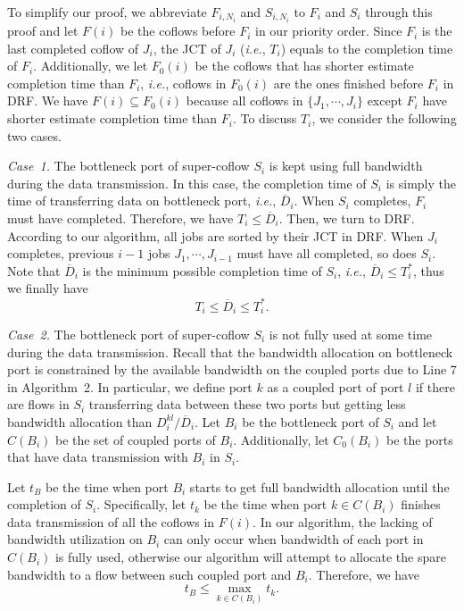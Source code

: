\documentclass[10pt, conference, letterpaper]{IEEEtran}
\begin{document}
\begin{IEEEproof}
To simplify our proof, we abbreviate $F_{i,N_i}$ and $S_{i,N_i}$ to $F_i$ and $S_i$ through this proof and let $F(i)$ be the coflows before $F_i$ in our priority order. Since $F_i$ is the last completed coflow of $J_i$, the JCT of $J_i$ (\emph{i.e.}, $T_i$) equals to the completion time of $F_i$. Additionally, we let $F_0(i)$ be the coflows that has shorter estimate completion time than $F_i$, \emph{i.e.}, coflows in $F_0(i)$ are the ones finished before $F_i$ in DRF. We have $F(i) \subseteq F_0(i)$ because all coflows in $\{J_1,\cdots,J_i\}$ except $F_i$ have shorter estimate completion time than $F_i$. To discuss $T_i$, we consider the following two cases.

\emph{Case~1.} The bottleneck port of super-coflow $S_i$ is kept using full bandwidth during the data transmission. In this case, the completion time of $S_i$ is simply the time of transferring data on bottleneck port, \emph{i.e.}, $\overline{D}_i$. When $S_i$ completes, $F_i$ must have completed. Therefore, we have $T_i \leq \overline{D}_i$. Then, we turn to DRF. According to our algorithm, all jobs are sorted by their JCT in DRF. When $J_i$ completes, previous $i-1$ jobs $J_1,\cdots,J_{i-1}$ must have all completed, so does $S_i$. Note that $\overline{D}_i$ is the minimum possible completion time of $S_i$, \emph{i.e.}, $\overline{D}_i \leq T_i^*$, thus we finally have
\begin{equation}\label{case1}
	T_i \leq \overline{D}_i \leq T_i^*.
\end{equation}

\emph{Case~2.} The bottleneck port of super-coflow $S_i$ is not fully used at some time during the data transmission. Recall that the bandwidth allocation on bottleneck port is constrained by the available bandwidth on the coupled ports due to Line 7 in Algorithm~2. In particular, we define port $k$ as a coupled port of port $l$ if there are flows in $S_i$ transferring data between these two ports but getting less bandwidth allocation than $D_i^{kl}/\overline{D}_i$. Let $B_i$ be the bottleneck port of $S_i$ and let $C(B_i)$ be the set of coupled ports of $B_i$. Additionally, let $C_0(B_i)$ be the ports that have data transmission with $B_i$ in $S_i$.

Let $t_B$ be the time when port $B_i$ starts to get full bandwidth allocation until the completion of $S_i$. Specifically, let $t_k$ be the time when port $k$$\in$$C(B_i)$ finishes data transmission of all the coflows in $F(i)$. In our algorithm, the lacking of bandwidth utilization on $B_i$ can only occur when bandwidth of each port in $C(B_i)$ is fully used, otherwise our algorithm will attempt to allocate the spare bandwidth to a flow between such coupled port and $B_i$. Therefore, we have
\begin{equation}
	t_B \leq \max_{k \in C(B_i)} t_k.
\end{equation}


\end{IEEEproof}
\end{document}

